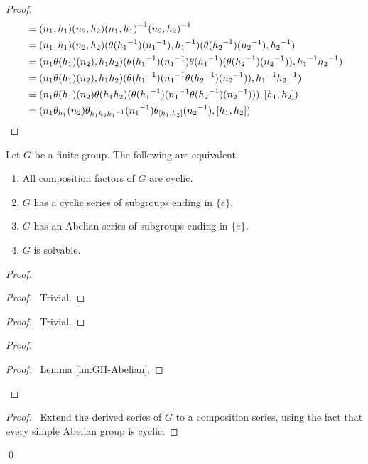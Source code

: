 \begin{proof}
\pf
{}
\begin{align*}
[(n_1,h_1),(n_2,h_2)] & = (n_1,h_1)(n_2,h_2)\inv{(n_1,h_1)}\inv{(n_2,h_2)} \\
& = (n_1,h_1)(n_2,h_2)(\theta(\inv{h_1})(\inv{n_1}),\inv{h_1})(\theta(\inv{h_2})(\inv{n_2}),\inv{h_2}) \\
& = (n_1 \theta(h_1)(n_2), h_1 h_2)(\theta(\inv{h_1})(\inv{n_1})\theta(\inv{h_1})(\theta(\inv{h_2})(\inv{n_2})),\inv{h_1}\inv{h_2}) \\
& = (n_1 \theta(h_1)(n_2), h_1 h_2)(\theta(\inv{h_1})(\inv{n_1} \theta(\inv{h_2})(\inv{n_2})),\inv{h_1}\inv{h_2}) \\
& = (n_1 \theta(h_1)(n_2) \theta(h_1h_2)(\theta(\inv{h_1})(\inv{n_1} \theta(\inv{h_2})(\inv{n_2}))),[h_1,h_2]) \\
& = (n_1 \theta_{h_1}(n_2) \theta_{h_1h_2\inv{h_1}}(\inv{n_1}) \theta_{[h_1,h_2]}(\inv{n_2}), [h_1,h_2])
\end{align*}
\end{proof}

\begin{prop}
\label{prop:solvable}
Let $G$ be a finite group. The following are equivalent.
\begin{enumerate}
\item All composition factors of $G$ are cyclic.
\item $G$ has a cyclic series of subgroups ending in $\{e\}$.
\item $G$ has an Abelian series of subgroups ending in $\{e\}$.
\item $G$ is solvable.
\end{enumerate}
\end{prop}

\begin{proof}
\pf
{}
\begin{proof}
	\pf\ Trivial.
\end{proof}
\begin{proof}
	\pf\ Trivial.
\end{proof}
\begin{proof}
	\begin{proof}
		\pf\ Lemma \ref{lm:GH-Abelian}.
	\end{proof}
\end{proof}
\begin{proof}
	\pf\ Extend the derived series of $G$ to a composition series, using the fact that every simple Abelian group is cyclic.
\end{proof}
\qed
\end{proof}

